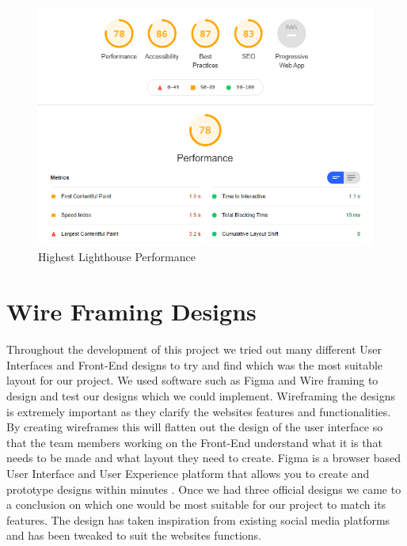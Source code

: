\begin{figure}[H]
  \centering
  \includegraphics[scale=0.6]{img/best_lighthouse.jpg}
  \caption{Highest Lighthouse Performance}
  \label{fig:highest_lighthouse}
\end{figure}

\newline

\section{Wire Framing Designs}

Throughout the development of this project we tried out many different User Interfaces and Front-End designs to try and find which was the most suitable layout for our project. We used software such as Figma and Wire framing to design and test our designs which we could implement. Wireframing the designs is extremely important as they clarify the websites features and functionalities. By creating wireframes this will flatten out the design of the user interface so that the team members working on the Front-End understand what it is that needs to be made and what layout they need to create. Figma is a browser based User Interface and User Experience platform that allows you to create and prototype designs within minutes \cite{figma}. Once we had three official designs we came to a conclusion on which one would be most suitable for our project to match its features. The design has taken inspiration from existing social media platforms and has been tweaked to suit the websites functions. 


